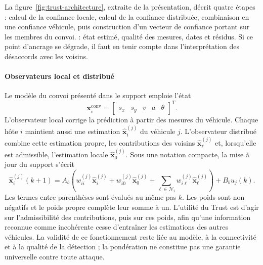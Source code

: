La figure~\ref{fig:trust-architecture}, extraite de la présentation, décrit quatre étapes : calcul de la confiance locale, calcul de la confiance distribuée, combinaison en une confiance véhicule, puis construction d'un vecteur de confiance portant sur les membres du convoi.  : état estimé, qualité des mesures, dates et résidus. Si ce point d'ancrage se dégrade, il faut en tenir compte dans l'interprétation des désaccords avec les voisins.


\paragraph{Observateurs local et distribué}
Le modèle du convoi présenté dans le support emploie l'état
\begin{equation}
\boldsymbol{x}^{\mathrm{conv}}_i=
\begin{bmatrix}s_x&s_y&v&a&\theta\end{bmatrix}^{T}.
\end{equation}
L'observateur local corrige la prédiction à partir des mesures du véhicule. Chaque hôte $i$ maintient aussi une estimation $\widehat{\boldsymbol{x}}_i^{(j)}$ du véhicule $j$. L'observateur distribué combine cette estimation propre, les contributions des voisins $\widehat{\boldsymbol{x}}_\ell^{(j)}$ et, lorsqu'elle est admissible, l'estimation locale $\widehat{\boldsymbol{x}}_0^{(j)}$. Sous une notation compacte, la mise à jour du support s'écrit
\begin{equation}
\widehat{\boldsymbol{x}}_i^{(j)}(k+1)=
A_b\!\left(w_{ii}^{(j)}\widehat{\boldsymbol{x}}_i^{(j)}
+w_{i0}^{(j)}\widehat{\boldsymbol{x}}_0^{(j)}
+\sum_{\ell\in\mathcal{N}_i}w_{i\ell}^{(j)}\widehat{\boldsymbol{x}}_\ell^{(j)}\right)
+B_bu_j(k).
\end{equation}
Les termes entre parenthèses sont évalués au même pas $k$. Les poids sont non négatifs et le poids propre complète leur somme à un. L'utilité du Trust est d'agir sur l'admissibilité des contributions, puis sur ces poids, afin qu'une information reconnue comme incohérente cesse d'entraîner les estimations des autres véhicules. La validité de ce fonctionnement reste liée au modèle, à la connectivité et à la qualité de la détection ; la pondération ne constitue pas une garantie universelle contre toute attaque.

